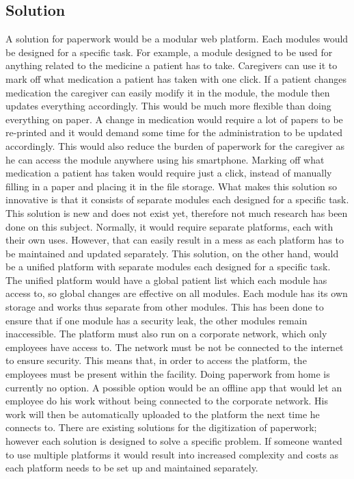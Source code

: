 \documentclass[a4paper, 11pt]{article}
\begin{document}
\begin{center}
\vspace*{1mm}
\section{Solution}
A solution for paperwork would be a modular web platform. Each modules
would be designed for a specific task. For example, a module designed to be
used for anything related to the medicine a patient has to take. Caregivers can
use it to mark off what medication a patient has taken with one click. If a
patient changes medication the caregiver can easily modify it in the module,
the module then updates everything accordingly.
This would be much more flexible than doing everything on paper. A change in
medication would require a lot of papers to be re-printed and it would demand
some time for the administration to be updated accordingly. This would also
reduce the burden of paperwork for the caregiver as he can access the module
anywhere using his smartphone. \cite{cherry2007perceptions} Marking off what medication a
patient has taken would require just a click, instead of manually filling in a
paper and placing it in the file storage.
What makes this solution so innovative is that it consists of separate modules
each designed for a specific task. This solution is new and does not exist yet,
therefore not much research has been done on this subject. Normally, it would
require separate platforms, each with their own uses. However, that can easily
result in a mess as each platform has to be maintained and updated separately.
This solution, on the other hand, would be a unified platform with separate
modules each designed for a specific task. The unified platform would have a
global patient list which each module has access to, so global changes are
effective on all modules.
Each module has its own storage and works thus separate from other modules.
This has been done to ensure that if one module has a security leak, the other
modules remain inaccessible. The platform must also run on a corporate
network, which only employees have access to. The network must be not be
connected to the internet to ensure security. This means that, in order to
access the platform, the employees must be present within the facility. Doing
paperwork from home is currently no option. A possible option would be an
offline app that would let an employee do his work without being connected to
the corporate network. His work will then be automatically uploaded to the
platform the next time he connects to.
There are existing solutions for the digitization of paperwork; however each
solution is designed to solve a specific problem. If someone wanted to use
multiple platforms it would result into increased complexity and costs as each
platform needs to be set up and maintained separately.


\end{center}
\end{document}
